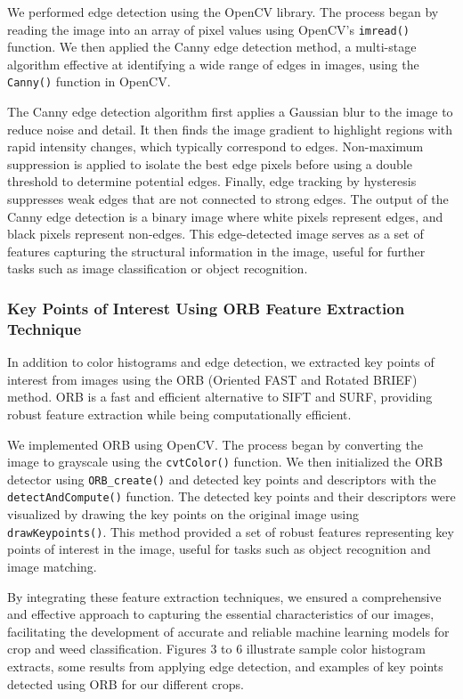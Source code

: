 \documentclass[10pt,twocolumn,letterpaper]{article}
\begin{document}
We performed edge detection using the OpenCV library. The process began by reading the image into an array of pixel values using OpenCV’s \texttt{imread()} function. We then applied the Canny edge detection method, a multi-stage algorithm effective at identifying a wide range of edges in images, using the \texttt{Canny()} function in OpenCV.

The Canny edge detection algorithm first applies a Gaussian blur to the image to reduce noise and detail. It then finds the image gradient to highlight regions with rapid intensity changes, which typically correspond to edges. Non-maximum suppression is applied to isolate the best edge pixels before using a double threshold to determine potential edges. Finally, edge tracking by hysteresis suppresses weak edges that are not connected to strong edges. The output of the Canny edge detection is a binary image where white pixels represent edges, and black pixels represent non-edges. This edge-detected image serves as a set of features capturing the structural information in the image, useful for further tasks such as image classification or object recognition.

\subsubsection{Key Points of Interest Using ORB Feature Extraction Technique}

In addition to color histograms and edge detection, we extracted key points of interest from images using the ORB (Oriented FAST and Rotated BRIEF) method. ORB is a fast and efficient alternative to SIFT and SURF, providing robust feature extraction while being computationally efficient.

We implemented ORB using OpenCV. The process began by converting the image to grayscale using the \texttt{cvtColor()} function. We then initialized the ORB detector using \texttt{ORB\_create()} and detected key points and descriptors with the \texttt{detectAndCompute()} function. The detected key points and their descriptors were visualized by drawing the key points on the original image using \texttt{drawKeypoints()}. This method provided a set of robust features representing key points of interest in the image, useful for tasks such as object recognition and image matching.

By integrating these feature extraction techniques, we ensured a comprehensive and effective approach to capturing the essential characteristics of our images, facilitating the development of accurate and reliable machine learning models for crop and weed classification. Figures 3 to 6 illustrate sample color histogram extracts, some results from applying edge detection, and examples of key points detected using ORB for our different crops.
\end{document}
